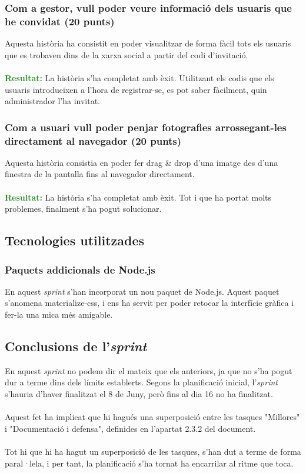 \documentclass[11pt,catalan,listoffigures,listoftables]{tfgetsinf}
\begin{document}
\subsubsection{Com a gestor, vull poder veure informació dels usuaris que he convidat (20 punts)}

Aquesta història ha consistit en poder visualitzar de forma fàcil tots els usuaris que es trobaven dins de la xarxa social a partir del codi d'invitació.\\ \\
\textcolor{forestgreen}{\textbf{Resultat:}} La història s'ha completat amb èxit. Utilitzant els codis que els usuaris introdueixen a l'hora de registrar-se, es pot saber fàcilment, quin administrador l'ha invitat.

\subsubsection{Com a usuari vull poder penjar fotografies arrossegant-les directament al navegador (20 punts)}

Aquesta història consistia en poder fer drag \& drop d'una imatge des d'una finestra de la pantalla fins al navegador directament.\\ \\
\textcolor{forestgreen}{\textbf{Resultat:}} La història s'ha completat amb èxit. Tot i que ha portat molts problemes, finalment s'ha pogut solucionar.

\subsection{Tecnologies utilitzades}

\subsubsection{Paquets addicionals de Node.js}

En aquest \textit{sprint} s'han incorporat un nou paquet de Node.js. Aquest paquet s'anomena materialize-css, i ens ha servit per poder retocar la interfície gràfica i fer-la una mica més amigable.

\subsection{Conclusions de l'\textit{sprint}}

En aquest \textit{sprint} no podem dir el mateix que els anteriors, ja que no s'ha pogut dur a terme dins dels límits establerts. Segons la planificació inicial, l'\textit{sprint} s'hauria d'haver finalitzat el 8 de Juny, però fins al dia 16 no ha finalitzat.\\ \\
Aquest fet ha implicat que hi hagués una superposició entre les tasques "Millores" i "Documentació i defensa", definides en l'apartat 2.3.2 del document.
\\ \\
Tot hi que hi ha hagut un superposició de les tasques, s'han dut a terme de forma paral·lela, i per tant, la planificació s'ha tornat ha encarrilar al ritme que toca.
\end{document}
